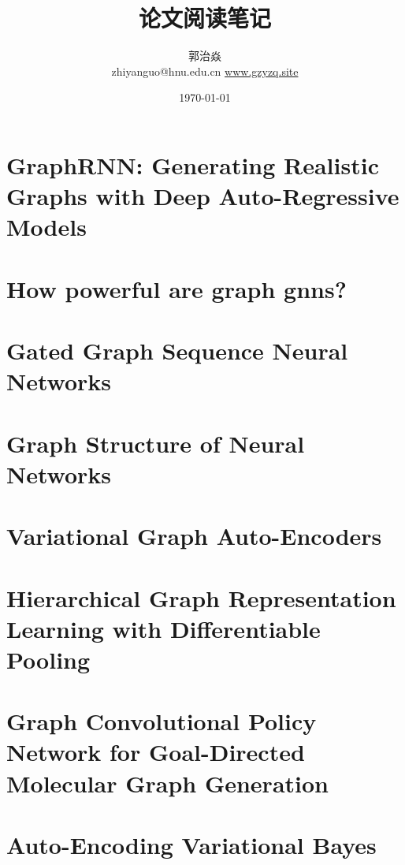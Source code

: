 \documentclass[a4paper,table]{article}
\title{论文阅读笔记}
\author{
郭治焱 \\ 
zhiyanguo@hnu.edu.cn \href{www.gzyzq.site}{www.gzyzq.site} \\ 
}
\date{\today}
\begin{document}

\maketitle

\tableofcontents
\listoffigures
\clearpage{\pagestyle{empty}\cleardoublepage}

\section{GraphRNN: Generating Realistic Graphs with Deep Auto-Regressive Models}


\clearpage
\section{How powerful are graph gnns?}


\clearpage
\section{Gated Graph Sequence Neural Networks}



\clearpage
\section{Graph Structure of Neural Networks}


\clearpage
\section{Variational Graph Auto-Encoders}


\clearpage
\section{Hierarchical Graph Representation Learning with Differentiable Pooling}


\section{Graph Convolutional Policy Network for Goal-Directed Molecular Graph Generation}


\section{Auto-Encoding Variational Bayes}

\end{document}
